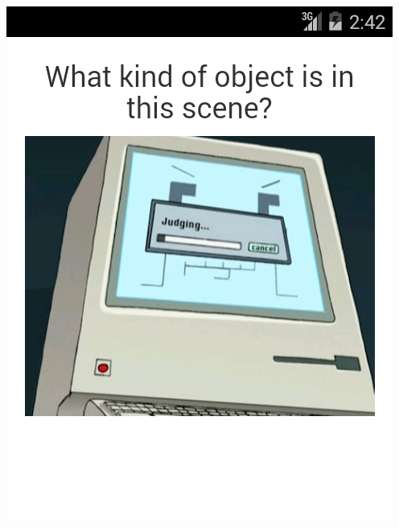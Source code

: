 \documentclass[aspectratio=169]{beamer}
\begin{document}
\begin{frame}
  \begin{columns}[c]
    \begin{column}{0.5\columnwidth}
      \includegraphics[width=\columnwidth]{ss_quickpic_image}
    \end{column}
    \begin{column}{0.5\columnwidth}

\end{column}
\end{columns}
\end{frame}
\end{document}
